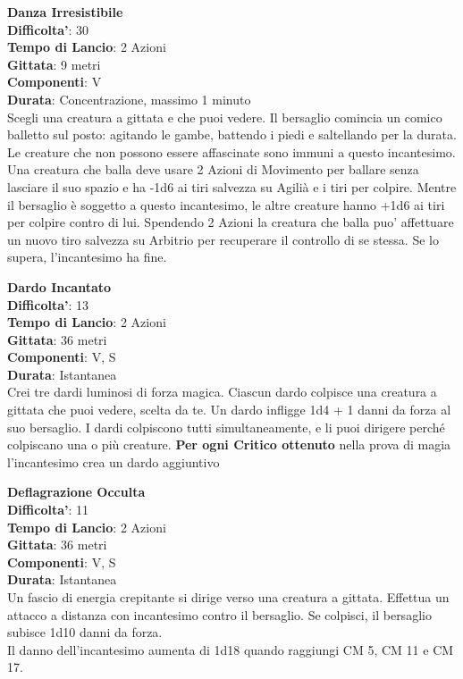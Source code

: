 \begin{multicols}{2}
\medskip\textbf{Danza Irresistibile}\\
\textbf{Difficolta'}: 30\\
\textbf{Tempo di Lancio}: 2 Azioni\\
\textbf{Gittata}: 9 metri\\
\textbf{Componenti}: V\\
\textbf{Durata}: Concentrazione, massimo 1 minuto\\
Scegli una creatura a gittata e che puoi vedere. Il bersaglio comincia un comico balletto sul posto: agitando le gambe, battendo i piedi e saltellando per la durata. Le creature che non possono essere affascinate sono immuni a questo incantesimo.\\
Una creatura che balla deve usare 2 Azioni di Movimento per ballare senza lasciare il suo spazio e ha -1d6 ai tiri salvezza su Agilià e i tiri per colpire. Mentre il bersaglio è soggetto a questo incantesimo, le altre creature hanno +1d6 ai tiri per colpire contro di lui. Spendendo 2 Azioni la creatura che balla puo' affettuare un nuovo tiro salvezza su Arbitrio per
recuperare il controllo di se stessa. Se lo supera, l’incantesimo ha fine.

\medskip\textbf{Dardo Incantato}\\
\textbf{Difficolta'}: 13\\
\textbf{Tempo di Lancio}: 2 Azioni\\
\textbf{Gittata}: 36 metri\\
\textbf{Componenti}: V, S\\
\textbf{Durata}: Istantanea\\
Crei tre dardi luminosi di forza magica. Ciascun dardo colpisce una creatura a gittata che puoi vedere, scelta da te. Un dardo infligge 1d4 + 1 danni da forza al suo bersaglio. I dardi colpiscono tutti simultaneamente, e li puoi dirigere perché colpiscano una o più creature.
\textbf{Per ogni Critico ottenuto} nella prova di magia l’incantesimo crea un dardo aggiuntivo

\medskip\textbf{Deflagrazione Occulta}\\
\textbf{Difficolta'}: 11\\
\textbf{Tempo di Lancio}: 2 Azioni\\
\textbf{Gittata}: 36 metri\\
\textbf{Componenti}: V, S\\
\textbf{Durata}: Istantanea\\
Un fascio di energia crepitante si dirige verso una creatura a gittata. Effettua un attacco a distanza con  incantesimo contro il bersaglio. Se colpisci, il bersaglio subisce 1d10 danni da forza.\\
Il danno dell’incantesimo aumenta di 1d18 quando raggiungi CM 5, CM 11 e CM 17.


\end{multicols}
